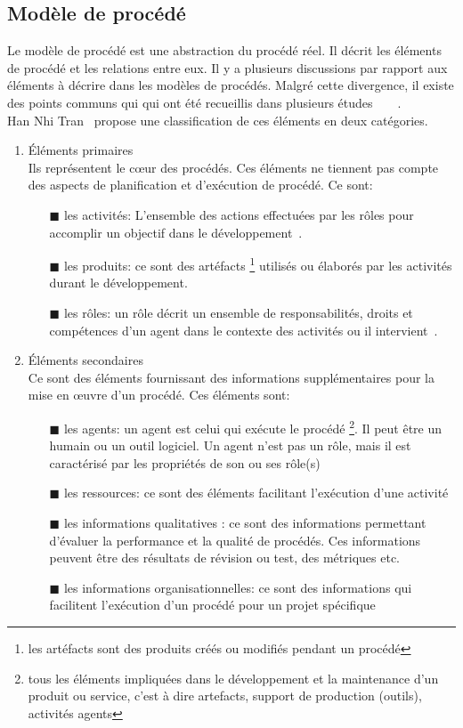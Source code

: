 \subsection{Modèle de procédé}
Le modèle de procédé est une abstraction du procédé réel. Il décrit les éléments de procédé et les relations entre eux. Il y a plusieurs discussions par rapport aux éléments à décrire dans les modèles de procédés. Malgré cette divergence, il existe des points communs qui qui ont été recueillis dans plusieurs études~\cite{jl}~\cite{abgm}~\cite{ac}~\cite{fin}.\\
Han Nhi Tran~\cite{hnt10} propose une classification de ces éléments en deux catégories.
\begin{enumerate}
\item Éléments primaires\\
Ils représentent le cœur des procédés. Ces éléments ne tiennent pas compte des aspects de planification et d'exécution de procédé. Ce sont:
\begin{itemize}
\item[\tiny{$\blacksquare$}] les activités: L'ensemble des actions effectuées par les rôles pour accomplir un objectif dans le développement~\cite{ml11}.
\item[\tiny{$\blacksquare$}] les produits: ce sont des artéfacts \footnote{ les artéfacts sont des produits créés ou modifiés pendant un procédé} utilisés ou élaborés par les activités durant le développement.
\item[\tiny{$\blacksquare$}] les rôles: un rôle décrit un ensemble de responsabilités, droits et compétences d'un agent dans le contexte des activités ou il intervient~\cite{ml11}. 
\end{itemize}
\item Éléments secondaires\\
Ce sont des éléments fournissant des informations supplémentaires pour la mise en œuvre d'un procédé. Ces éléments sont: 
\begin{itemize}
\item[\tiny{$\blacksquare$}] les agents: un agent est celui qui exécute le procédé \footnote{ tous les éléments impliquées dans le développement et la maintenance d'un produit ou service, c'est à dire artefacts, support de production (outils), activités agents}. Il peut être un humain ou un outil logiciel. Un agent n'est pas un rôle, mais il est caractérisé par les propriétés de son ou ses rôle(s)~\cite{ml11} 
\item[\tiny{$\blacksquare$}] les ressources: ce sont des éléments facilitant l'exécution d'une activité~\cite{hnt10}
\item[\tiny{$\blacksquare$}] les informations qualitatives : ce sont des informations permettant d'évaluer la performance et la qualité de procédés. Ces informations peuvent être des résultats de révision ou test, des métriques etc.~\cite{hnt10}
\item[\tiny{$\blacksquare$}] les informations organisationnelles: ce sont des informations qui facilitent l'exécution d'un procédé pour un projet spécifique
\end{itemize}
\end{enumerate}
